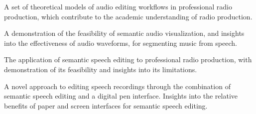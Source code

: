 










  A set of theoretical models of audio editing workflows in professional radio production, which
  contribute to the academic understanding of radio production.

  A demonstration of the feasibility of semantic audio visualization, and insights into the
  effectiveness of audio waveforms, for segmenting music from speech.

  The application of semantic speech editing to professional radio production, with
  demonstration of its feasibility and insights into its limitations. 

  A novel approach to editing speech recordings through the combination of semantic speech
  editing and a digital pen interface. Insights into the relative benefits of paper and screen interfaces for semantic
  speech editing.


